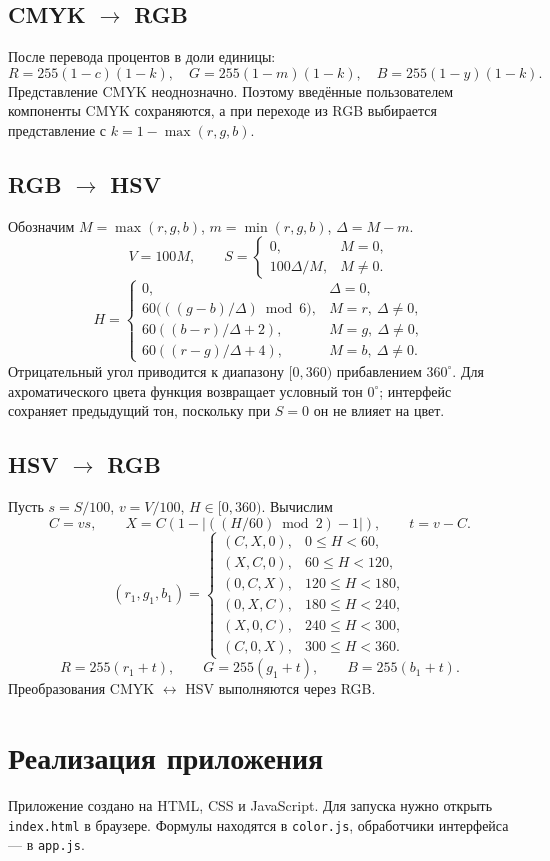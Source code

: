 \documentclass[12pt,a4paper]{article}
\begin{document}
\subsection{CMYK $\to$ RGB}
После перевода процентов в доли единицы:
\[R=255(1-c)(1-k),\quad G=255(1-m)(1-k),\quad B=255(1-y)(1-k).\]
Представление CMYK неоднозначно. Поэтому введённые пользователем компоненты CMYK сохраняются, а при переходе из RGB выбирается представление с $k=1-\max(r,g,b)$.
\subsection{RGB $\to$ HSV}
Обозначим $M=\max(r,g,b)$, $m=\min(r,g,b)$, $\Delta=M-m$.
\[V=100M,\qquad S=\begin{cases}0,&M=0,\\100\Delta/M,&M\ne0.\end{cases}\]
\[H=\begin{cases}0,&\Delta=0,\\60\bigl(((g-b)/\Delta)\bmod6\bigr),&M=r,\ \Delta\ne0,\\60((b-r)/\Delta+2),&M=g,\ \Delta\ne0,\\60((r-g)/\Delta+4),&M=b,\ \Delta\ne0.\end{cases}\]
Отрицательный угол приводится к диапазону $[0,360)$ прибавлением $360^\circ$. Для ахроматического цвета функция возвращает условный тон $0^\circ$; интерфейс сохраняет предыдущий тон, поскольку при $S=0$ он не влияет на цвет.
\subsection{HSV $\to$ RGB}
Пусть $s=S/100$, $v=V/100$, $H\in[0,360)$. Вычислим
\[C=vs,\qquad X=C\left(1-\left|((H/60)\bmod2)-1\right|\right),\qquad t=v-C.\]
\[(r_1,g_1,b_1)=\begin{cases}(C,X,0),&0\le H<60,\\(X,C,0),&60\le H<120,\\(0,C,X),&120\le H<180,\\(0,X,C),&180\le H<240,\\(X,0,C),&240\le H<300,\\(C,0,X),&300\le H<360.\end{cases}\]
\[R=255(r_1+t),\qquad G=255(g_1+t),\qquad B=255(b_1+t).\]
Преобразования CMYK $\leftrightarrow$ HSV выполняются через RGB.

\section{Реализация приложения}
Приложение создано на HTML, CSS и JavaScript. Для запуска нужно открыть \texttt{index.html} в браузере. Формулы находятся в \texttt{color.js}, обработчики интерфейса — в \texttt{app.js}.
\end{document}
